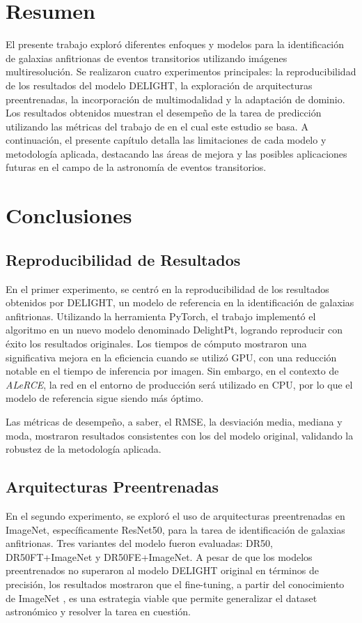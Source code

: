 \documentclass[../tesis.tex]{subfiles}
\begin{document}
\section{Resumen}
El presente trabajo exploró diferentes enfoques y modelos para la identificación de galaxias anfitrionas de eventos transitorios utilizando imágenes multiresolución. Se realizaron cuatro experimentos principales: la reproducibilidad de los resultados del modelo DELIGHT, la exploración de arquitecturas preentrenadas, la incorporación de multimodalidad y la adaptación de dominio. Los resultados obtenidos muestran el desempeño de la tarea de predicción utilizando las métricas del trabajo de \cite{delight} en el cual este estudio se basa. A continuación, el presente capítulo detalla las limitaciones de cada modelo y metodología aplicada, destacando las áreas de mejora y las posibles aplicaciones futuras en el campo de la astronomía de eventos transitorios.

\section{Conclusiones}

\subsection{Reproducibilidad de Resultados}
En el primer experimento, se centró en la reproducibilidad de los resultados obtenidos por DELIGHT, un modelo de referencia en la identificación de galaxias anfitrionas. Utilizando la herramienta PyTorch, el trabajo implementó el algoritmo en un nuevo modelo denominado DelightPt, logrando reproducir con éxito los resultados originales. Los tiempos de cómputo mostraron una significativa mejora en la eficiencia cuando se utilizó GPU, con una reducción notable en el tiempo de inferencia por imagen. Sin embargo, en el contexto de \textit{ALeRCE}, la red en el entorno de producción será utilizado en CPU, por lo que el modelo de referencia sigue siendo más óptimo.\par\null\par

Las métricas de desempeño, a saber, el RMSE, la desviación media, mediana y moda, mostraron resultados consistentes con los del modelo original, validando la robustez de la metodología aplicada.

\subsection{Arquitecturas Preentrenadas}
En el segundo experimento, se exploró el uso de arquitecturas preentrenadas en ImageNet, específicamente ResNet50, para la tarea de identificación de galaxias anfitrionas. Tres variantes del modelo fueron evaluadas: DR50, DR50FT+ImageNet y DR50FE+ImageNet. A pesar de que los modelos preentrenados no superaron al modelo DELIGHT original en términos de precisión, los resultados mostraron que el fine-tuning, a partir del conocimiento de ImageNet \cite{imagenet}, es una estrategia viable que permite generalizar el dataset astronómico y resolver la tarea en cuestión.\par\null\par
\end{document}
